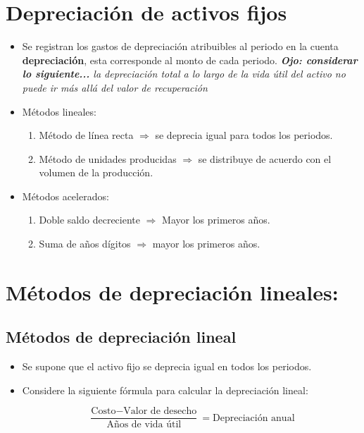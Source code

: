 \documentclass{article}
\begin{document}
\section{Depreciación de activos fijos}
\begin{itemize}
    \item Se registran los gastos de depreciación atribuibles al periodo en la cuenta \textbf{depreciación}, esta corresponde al monto de cada periodo. \emph{\textbf{Ojo: considerar lo siguiente...}  la depreciación total a lo largo de la vida útil del activo no puede ir más allá del valor de recuperación}
    \item Métodos lineales:
        \begin{enumerate}
            \item Método de línea recta $\Rightarrow$ se deprecia igual para todos los periodos.
            \item Método de unidades producidas $\Rightarrow$ se distribuye de acuerdo con el volumen de la producción. 
        \end{enumerate}
    
    \item Métodos acelerados:
        \begin{enumerate}
            \item Doble saldo decreciente $\Rightarrow$ Mayor los primeros años.
            \item Suma de años dígitos $\Rightarrow$ mayor los primeros años.
        \end{enumerate}
\end{itemize}

\section{Métodos de depreciación lineales:}
\subsection{Métodos de depreciación lineal}
\begin{itemize}
    \item Se supone que el activo fijo se deprecia igual en todos los periodos.
    \item Considere la siguiente fórmula para calcular la depreciación lineal:
        \begin{center}
            \[
              \frac{\text{Costo} - \text{Valor de desecho}}{\text{Años de vida útil}} = \text{Depreciación anual} 
            \]
        \end{center}
\end{itemize}
\end{document}
